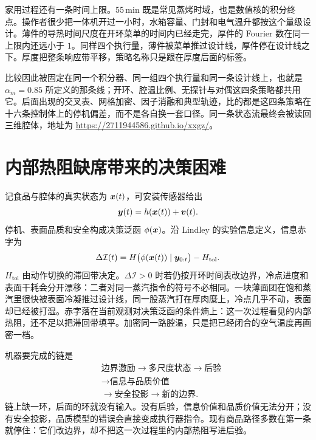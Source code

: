家用过程还有一条时间上限。\(55\,\mathrm{min}\) 既是常见蒸烤时域，也是数值核的积分终点。操作者很少把一体机开过一小时，水箱容量、门封和电气温升都按这个量级设计。薄件的导热时间尺度在开环菜单的时间内已经走完，厚件的 Fourier 数在同一上限内还远小于 \(1\)。同样四个执行量，薄件被菜单推过设计线，厚件停在设计线之下。厚度把整条响应带平移，策略名称只是跟在厚度后面的标签。

比较因此被固定在同一个积分器、同一组四个执行量和同一条设计线上，也就是 \(\alpha_m=0.85\) 所定义的那条线；开环、腔温比例、无探针与对偶这四条策略都共用它。后面出现的交叉表、网格加密、因子消融和典型轨迹，比的都是这四条策略在十六条控制体上的停机偏差，而不是各自换一套口径。同一条状态流最终会被读回三维腔体，地址为 \url{https://2711944586.github.io/xxgz/}。

\section{内部热阻缺席带来的决策困难}

记食品与腔体的真实状态为 \(\bm{x}(t)\)，可安装传感器给出
\[
\bm{y}(t)=h(\bm{x}(t))+\bm{v}(t).
\]
停机、表面品质和安全构成决策泛函 \(\phi(\bm{x})\)。沿 Lindley 的实验信息定义\cite{lindley1956}，信息赤字为
\begin{equation}
\label{eq:deficit}
\Delta\mathcal{I}(t)=H\big(\phi(\bm{x}(t))\mid \bm{y}_{0:t}\big)-H_{\mathrm{tol}}.
\end{equation}
\(H_{\mathrm{tol}}\) 由动作切换的滞回带决定。\(\Delta\mathcal{I}>0\) 时若仍按开环时间表改边界，冷点进度和表面干耗会分开漂移：二者对同一蒸汽指令的符号不必相同。一块薄面团在饱和蒸汽里很快被表面冷凝推过设计线，同一股蒸汽打在厚肉糜上，冷点几乎不动，表面却已经被打湿。赤字落在当前观测对决策泛函的条件熵上：这一次过程看见的内部热阻，还不足以把滞回带填平。加密同一路腔温，只是把已经闭合的空气温度再画密一档。

机器要完成的链是
\begin{equation}
\label{eq:chain}
\begin{aligned}
&\text{边界激励}\to\text{多尺度状态}\to\text{后验}\\
&\to\text{信息与品质价值}\\
&\to\text{安全投影}\to\text{新的边界}.
\end{aligned}
\end{equation}
链上缺一环，后面的环就没有输入。没有后验，信息价值和品质价值无法分开；没有安全投影，品质模型的错误会直接变成执行器指令。现有商品路径多数在第一条就停住：它们改边界，却不把这一次过程里的内部热阻写进后验。

